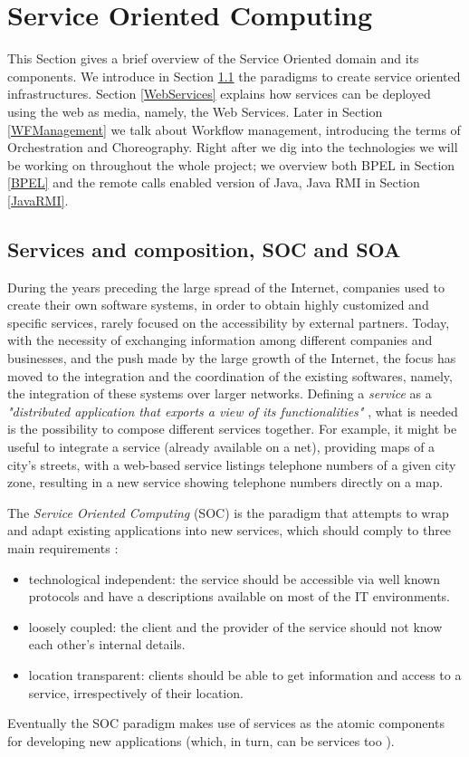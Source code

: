 \section{Service Oriented Computing}
\label{ServiceOrientedComputing}
This Section gives a brief overview of the Service Oriented domain and its components. We introduce in Section \ref{SOC&SOA} the paradigms to create service oriented infrastructures. Section \ref{WebServices} explains how services can be deployed using the web as media, namely, the Web Services. 
Later in Section \ref{WFManagement} we talk about Workflow management, introducing the terms of Orchestration and Choreography. Right after we dig into the technologies we will be working on throughout the whole project; we overview both BPEL in Section \ref{BPEL} and the remote calls enabled version of Java, Java RMI in Section \ref{JavaRMI}.   

\subsection{Services and composition, SOC and SOA}
\label{SOC&SOA}
During the years preceding the large spread of the Internet, companies used to create their own software systems, in order to obtain highly customized and specific services, rarely focused on the accessibility by external partners.
Today, with the necessity of exchanging information among different companies and businesses, and the push made by the large growth of the Internet, the focus has moved to the integration and the coordination of the existing softwares, namely, the integration of these systems over larger networks.
Defining a \textit{service} as a \textit{"distributed application that exports a view of its functionalities"} \cite{DiLorenzo08}, what is needed is the possibility to compose different services together.
For example, it might be useful to integrate a service (already available on a net), providing maps of a city's streets, with a web-based service listings telephone numbers of a given city zone, resulting in a new service showing telephone numbers directly on a map. %
  
The \textit{Service Oriented Computing} (SOC) is the paradigm that attempts to wrap and adapt existing applications into new services, which should comply to three main requirements \cite{DiLorenzo08,Papazoglou03}:
\begin{itemize}
 \item technological independent: the service should be accessible via well known protocols and have a descriptions available on most of the IT environments.
 \item loosely coupled: the client and the provider of the service should not know each other's internal details.
 \item location transparent: clients should be able to get information and access to a service, irrespectively of their location. 
\end{itemize}
Eventually the SOC paradigm makes use of services as the atomic components for developing new applications (which, in turn, can be services too \cite{Papazoglou03}).


